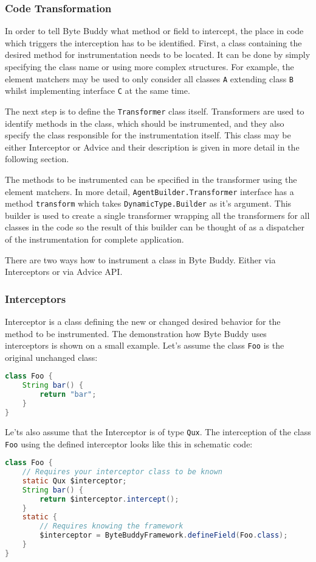 \subsubsection{Code Transformation}
In order to tell Byte Buddy what method or field to intercept, the place in code which triggers the interception has to be identified. First, a class containing the desired method for instrumentation needs to be located. It can be done by simply specifying the class name or using more complex structures. For example, the element matchers may be used to only consider all classes \texttt{A} extending class \texttt{B} whilst implementing interface \texttt{C} at the same time. 

The next step is to define the \texttt{Transformer} class itself. Transformers are used to identify methods in the class, which should be instrumented, and they also specify the class responsible for the instrumentation itself. This class may be either Interceptor or Advice and their description is given in more detail in the following section. 

The methods to be instrumented can be specified in the transformer using the element matchers. In more detail, \texttt{AgentBuilder.Transformer} interface has a method \texttt{transform} which takes \texttt{DynamicType.Builder} as it's argument. This builder is used to create a single transformer wrapping all the transformers for all classes in the code so the result of this builder can be thought of as a dispatcher of the instrumentation for complete application.

There are two ways how to instrument a class in Byte Buddy. Either via Interceptors or via Advice API.
\subsubsection{Interceptors}
Interceptor is a class defining the new or changed desired behavior for the method to be instrumented.  The demonstration how Byte Buddy uses interceptors is shown on a small example. Let's assume the class \texttt{Foo} is the original unchanged class:
\begin{lstlisting}[language=Java]
class Foo {
	String bar() {
		return "bar"; 
	}
}
\end{lstlisting}
	
Le'ts also assume that the Interceptor is of type \texttt{Qux}. The interception of the class \texttt{Foo} using the defined interceptor looks like this in schematic code:

\begin{lstlisting}[language=Java]
class Foo {
	// Requires your interceptor class to be known
	static Qux $interceptor;
	String bar() {
		return $interceptor.intercept(); 
	}
	static {
		// Requires knowing the framework
		$interceptor = ByteBuddyFramework.defineField(Foo.class);
	}
}
\end{lstlisting}
		
